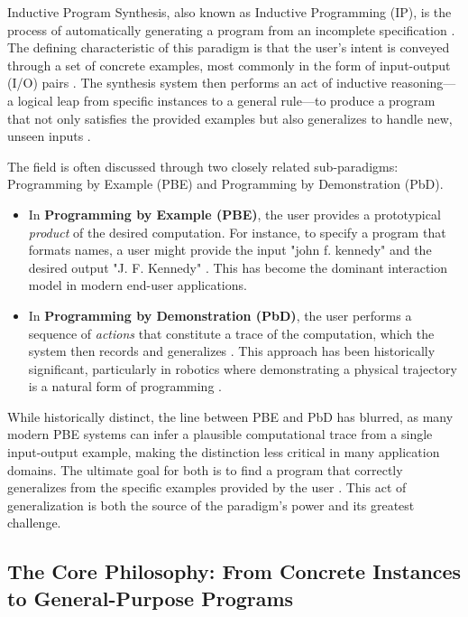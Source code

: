 \documentclass[12pt, a4paper]{report}
\begin{document}
Inductive Program Synthesis, also known as Inductive Programming (IP), is the process of automatically generating a program from an incomplete specification \citep{gulwani2017program, kulesza2012end}. The defining characteristic of this paradigm is that the user's intent is conveyed through a set of concrete examples, most commonly in the form of input-output (I/O) pairs \citep{gulwani2012dimensions}. The synthesis system then performs an act of inductive reasoning—a logical leap from specific instances to a general rule—to produce a program that not only satisfies the provided examples but also generalizes to handle new, unseen inputs \citep{summers1977methodology, lee2024code}.

The field is often discussed through two closely related sub-paradigms: Programming by Example (PBE) and Programming by Demonstration (PbD).
\begin{itemize}
    \item In \textbf{Programming by Example (PBE)}, the user provides a prototypical \textit{product} of the desired computation. For instance, to specify a program that formats names, a user might provide the input "john f. kennedy" and the desired output "J. F. Kennedy" \citep{gulwani2011automating}. This has become the dominant interaction model in modern end-user applications.
    \item In \textbf{Programming by Demonstration (PbD)}, the user performs a sequence of \textit{actions} that constitute a trace of the computation, which the system then records and generalizes \citep{cypher1993watch}. This approach has been historically significant, particularly in robotics where demonstrating a physical trajectory is a natural form of programming \citep{argall2009survey}.
\end{itemize}

While historically distinct, the line between PBE and PbD has blurred, as many modern PBE systems can infer a plausible computational trace from a single input-output example, making the distinction less critical in many application domains. The ultimate goal for both is to find a program that correctly generalizes from the specific examples provided by the user \citep{lee2024code}. This act of generalization is both the source of the paradigm's power and its greatest challenge.

\subsection{The Core Philosophy: From Concrete Instances to General-Purpose Programs}
\end{document}
